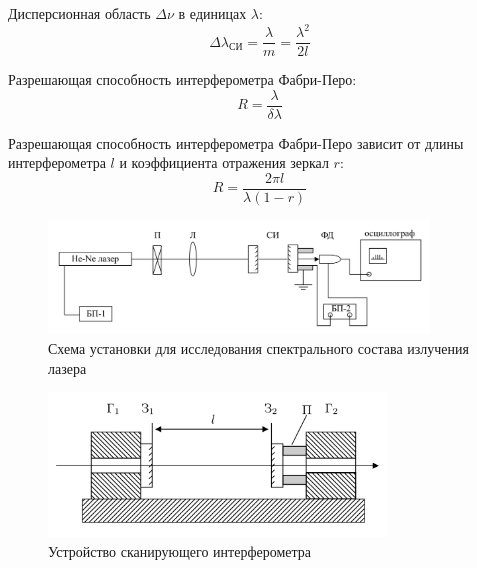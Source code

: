 \documentclass[a4paper, 12pt]{article}
\begin{document}
Дисперсионная область $\Delta \nu$ в единицах $\lambda$:
\begin{equation} \label{eq:disp}
\Delta \lambda_{\text{СИ}} = \frac{\lambda}{m}= \frac{\lambda^2}{2l}
\end{equation}

Разрешающая способность интерферометра Фабри-Перо:
\begin{equation} \label{eq:resolution}
R = \frac{\lambda}{\delta{\lambda}}
\end{equation}

Разрешающая способность интерферометра Фабри-Перо зависит от длины интерферометра $l$ и коэффициента отражения зеркал $r$:
\begin{equation} \label{eq:refl}
R = \frac{2\pi l}{\lambda (1-r)}
\end{equation}

\begin{figure}[H]
	\centering
	\includegraphics[width=0.9\textwidth]{1.png}
	\caption{Схема установки для исследования спектрального состава излучения лазера}
	\label{fig:ust}
\end{figure}

\begin{figure}[H]
	\centering
	\includegraphics[width=0.8\textwidth]{2.png}
	\caption{Устройство сканирующего интерферометра}
	\label{fig:rez}
\end{figure}
\end{document}
